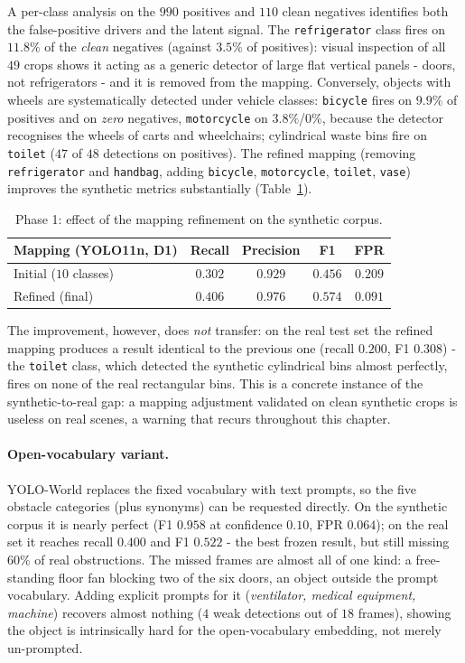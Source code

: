 A per-class analysis on the $990$ positives and $110$ clean negatives
identifies both the false-positive drivers and the latent signal. The
\texttt{refrigerator} class fires on $11.8\%$ of the \emph{clean} negatives
(against $3.5\%$ of positives): visual inspection of all $49$ crops shows it
acting as a generic detector of large flat vertical panels - doors, not
refrigerators - and it is removed from the mapping. Conversely, objects with
wheels are systematically detected under vehicle classes: \texttt{bicycle}
fires on $9.9\%$ of positives and on \emph{zero} negatives, \texttt{motorcycle}
on $3.8\%$/$0\%$, because the detector recognises the wheels of carts and
wheelchairs; cylindrical waste bins fire on \texttt{toilet} ($47$ of $48$
detections on positives). The refined mapping (removing
\texttt{refrigerator} and \texttt{handbag}, adding \texttt{bicycle},
\texttt{motorcycle}, \texttt{toilet}, \texttt{vase}) improves the synthetic
metrics substantially (Table~\ref{tab:p1-mapping}).

\begin{table}[h]
  \centering
  \begin{tabular}{lcccc}
    \hline
    Mapping (YOLO11n, D1) & Recall & Precision & F1 & FPR \\
    \hline
    Initial ($10$ classes) & $0.302$ & $0.929$ & $0.456$ & $0.209$ \\
    Refined (final) & $0.406$ & $0.976$ & $\mathbf{0.574}$ & $0.091$ \\
    \hline
  \end{tabular}
  \caption{Phase 1: effect of the mapping refinement on the synthetic corpus.}
  \label{tab:p1-mapping}
\end{table}

The improvement, however, does \emph{not} transfer: on the real test set the
refined mapping produces a result identical to the previous one (recall
$0.200$, F1 $0.308$) - the \texttt{toilet} class, which detected the synthetic
cylindrical bins almost perfectly, fires on none of the real rectangular bins.
This is a concrete instance of the synthetic-to-real gap: a mapping adjustment
validated on clean synthetic crops is useless on real scenes, a warning that
recurs throughout this chapter.

\paragraph{Open-vocabulary variant.} YOLO-World \cite{Cheng2024yoloworld}
replaces the fixed vocabulary with text prompts, so the five obstacle
categories (plus synonyms) can be requested directly. On the synthetic corpus
it is nearly perfect (F1 $0.958$ at confidence $0.10$, FPR $0.064$); on the
real set it reaches recall $0.400$ and F1 $0.522$ - the best frozen result,
but still missing $60\%$ of real obstructions. The missed frames are almost
all of one kind: a free-standing floor fan blocking two of the six doors, an
object outside the prompt vocabulary. Adding explicit prompts for it
(\emph{ventilator, medical equipment, machine}) recovers almost nothing
($4$ weak detections out of $18$ frames), showing the object is intrinsically
hard for the open-vocabulary embedding, not merely un-prompted.

